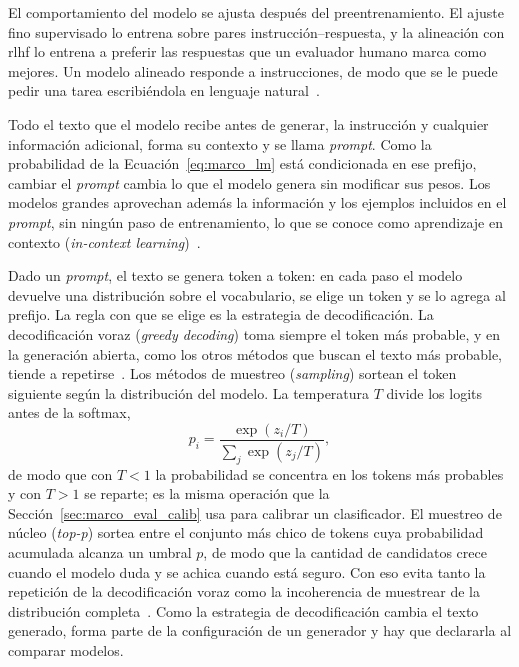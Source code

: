 El comportamiento del modelo se ajusta después del preentrenamiento. El ajuste fino supervisado lo entrena
sobre pares instrucción--respuesta, y la alineación con \gls{rlhf} lo entrena a preferir las
respuestas que un evaluador humano marca como mejores. Un modelo alineado responde a instrucciones, de modo
que se le puede pedir una tarea escribiéndola en lenguaje natural~\cite{ouyang2022training}.

Todo el texto que el modelo recibe antes de generar, la instrucción y cualquier información adicional,
forma su contexto y se llama \emph{prompt}. Como la probabilidad de la Ecuación~\ref{eq:marco_lm} está
condicionada en ese prefijo, cambiar el \emph{prompt} cambia lo que el modelo genera sin modificar sus
pesos. Los modelos grandes aprovechan además la información y los ejemplos incluidos en el \emph{prompt}, sin
ningún paso de entrenamiento, lo que se conoce como aprendizaje en contexto
(\emph{in-context learning})~\cite{brown2020language}.

Dado un \emph{prompt}, el texto se genera token a token: en cada paso el modelo devuelve una distribución
sobre el vocabulario, se elige un token y se lo agrega al prefijo. La regla con que se elige es la
estrategia de decodificación. La decodificación voraz (\emph{greedy decoding}) toma siempre el token más
probable, y en la generación abierta, como los otros métodos que buscan el texto más probable, tiende a
repetirse~\cite{holtzman2020curious}. Los
métodos de muestreo (\emph{sampling}) sortean el token siguiente según la distribución del modelo. La
temperatura $T$ divide los logits antes de la softmax,
\begin{equation}
    p_i = \frac{\exp(z_i / T)}{\sum_{j} \exp(z_j / T)},
    \label{eq:marco_temperatura}
\end{equation}
de modo que con $T<1$ la probabilidad se concentra en los tokens más probables y con $T>1$ se reparte; es
la misma operación que la Sección~\ref{sec:marco_eval_calib} usa para calibrar un clasificador. El muestreo de
núcleo (\emph{top-p}) sortea entre el conjunto más chico de tokens cuya probabilidad acumulada alcanza un
umbral $p$, de modo que la cantidad de candidatos crece cuando el modelo duda y se achica cuando está seguro.
Con eso evita tanto la repetición de la decodificación voraz como la incoherencia de muestrear de la
distribución completa~\cite{holtzman2020curious}. Como la estrategia de decodificación cambia el texto
generado, forma parte de la configuración de un generador y hay que declararla al comparar modelos.

